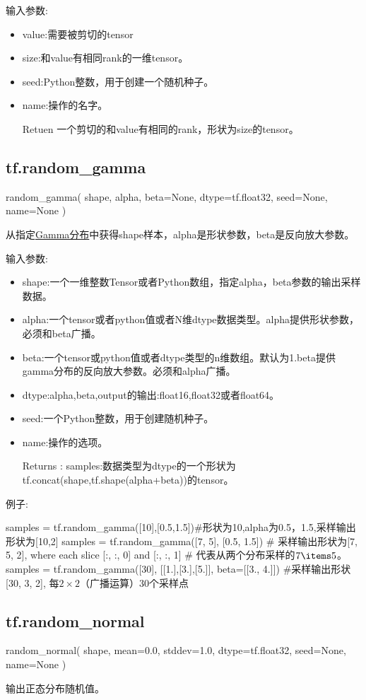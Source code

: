 输入参数:
\begin{itemize}
\item value:需要被剪切的tensor
\item size:和value有相同rank的一维tensor。
\item seed:Python整数，用于创建一个随机种子。
\item name:操作的名字。
\item[Retuen] 一个剪切的和value有相同的rank，形状为size的tensor。
\end{itemize}
\subsection{tf.random\_gamma}
\begin{python}
random_gamma(
    shape,
    alpha,
    beta=None,
    dtype=tf.float32,
    seed=None,
    name=None
)
\end{python}
从指定\href{https://zh.wikipedia.org/wiki/伽玛分布}{Gamma分布}中获得shape样本，alpha是形状参数，beta是反向放大参数。

输入参数:
\begin{itemize}
\item shape:一个一维整数Tensor或者Python数组，指定alpha，beta参数的输出采样数据。
\item alpha:一个tensor或者python值或者N维dtype数据类型。alpha提供形状参数，必须和beta广播。
\item beta:一个tensor或python值或者dtype类型的n维数组。默认为1.beta提供gamma分布的反向放大参数。必须和alpha广播。
\item dtype:alpha,beta,output的输出:float16,float32或者float64。
\item seed:一个Python整数，用于创建随机种子。
\item name:操作的选项。
\item[Returns]:
samples:数据类型为dtype的一个形状为tf.concat(shape,tf.shape(alpha+beta))的tensor。
\end{itemize}
例子:
\begin{python}
samples = tf.random_gamma([10],[0.5,1.5])#形状为10,alpha为0.5，1.5,采样输出形状为[10,2]
samples = tf.random_gamma([7, 5], [0.5, 1.5]) # 采样输出形状为[7, 5, 2], where each slice [:, :, 0] and [:, :, 1] # 代表从两个分布采样的$7\items5$。
samples = tf.random_gamma([30], [[1.],[3.],[5.]], beta=[[3., 4.]]) #采样输出形状[30, 3, 2], 每$2\times2$（广播运算）30个采样点
\end{python}
\subsection{tf.random\_normal}
\begin{python}
random_normal(
    shape,
    mean=0.0,
    stddev=1.0,
    dtype=tf.float32,
    seed=None,
    name=None
)
\end{python}
输出正态分布随机值。

